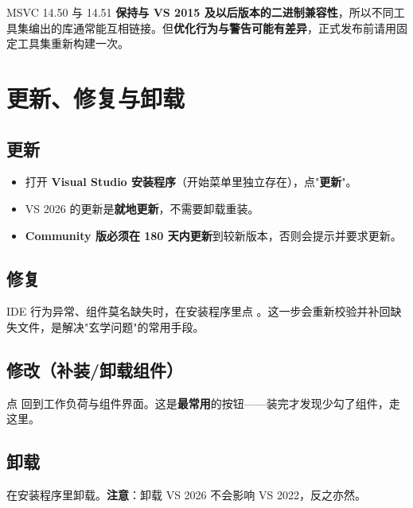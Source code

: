 \begin{warnbox}[注意]
MSVC 14.50 与 14.51 \textbf{保持与 VS 2015 及以后版本的二进制兼容性}，所以不同工具集编出的库通常能互相链接。但\textbf{优化行为与警告可能有差异}，正式发布前请用固定工具集重新构建一次。
\end{warnbox}

\section{更新、修复与卸载}
\subsection{更新}
\begin{itemize}
  \item 打开 \textbf{Visual Studio 安装程序}（开始菜单里独立存在），点"\textbf{更新}"。
  \item VS 2026 的更新是\textbf{就地更新}，不需要卸载重装。
  \item \textbf{Community 版必须在 180 天内更新}到较新版本，否则会提示并要求更新。
\end{itemize}

\subsection{修复}
IDE 行为异常、组件莫名缺失时，在安装程序里点 。这一步会重新校验并补回缺失文件，是解决"玄学问题"的常用手段。

\subsection{修改（补装/卸载组件）}
点  回到工作负荷与组件界面。这是\textbf{最常用}的按钮——装完才发现少勾了组件，走这里。

\subsection{卸载}
在安装程序里卸载。\textbf{注意}：卸载 VS 2026 不会影响 VS 2022，反之亦然。

